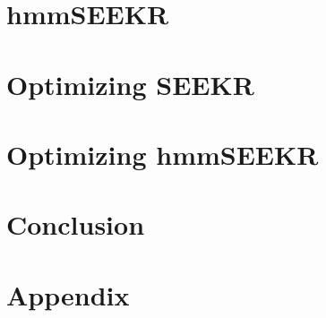 \documentclass[12pt,left=2in,right=1in,top=1in,bottom=1in]{report}
\begin{document}
\chapter{hmmSEEKR}


\chapter{Optimizing SEEKR}


\chapter{Optimizing hmmSEEKR}


\chapter{Conclusion}


\appendix
\chapter{Appendix}

\end{document}
